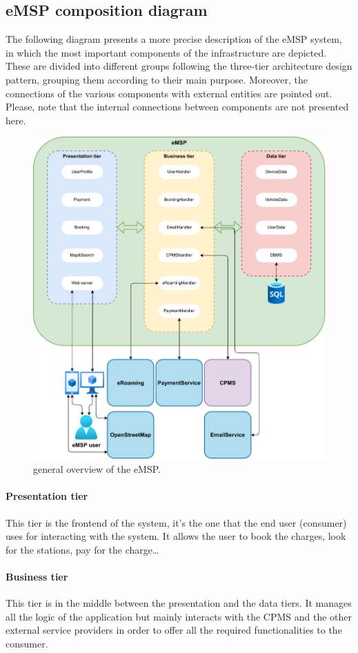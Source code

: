 \subsection{eMSP composition diagram}

The following diagram presents a more precise description of the eMSP system, in which the most important components of the infrastructure are depicted. These are divided into different groups following the three-tier architecture design pattern, grouping them according to their main purpose. Moreover, the connections of the various components with external entities are pointed out. Please, note that the internal connections between components are not presented here.

\begin{figure}[h!]
    \centering
    \includegraphics[width=0.79\columnwidth]{./images/overview/emsp}
    \caption{general overview of the eMSP.}
\end{figure}

\paragraph{Presentation tier} This tier is the frontend of the system, it's the one that the end user (consumer) uses for interacting with the system. It allows the user to book the charges, look for the stations, pay for the charge\dots

\paragraph{Business tier} This tier is in the middle between the presentation and the data tiers. It manages all the logic of the application but mainly interacts with the CPMS and the other external service providers in order to offer all the required functionalities to the consumer.

